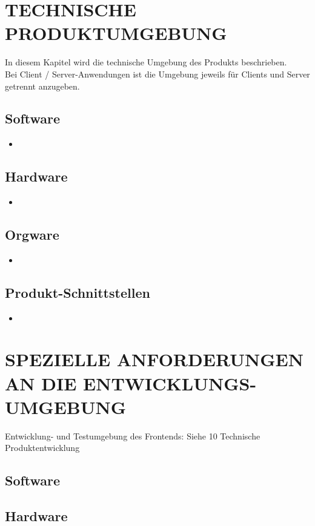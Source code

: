 	
	\section{\Large TECHNISCHE PRODUKTUMGEBUNG}
   	In diesem Kapitel wird die technische Umgebung des Produkts beschrieben.\\
   	Bei Client / Server-Anwendungen ist die Umgebung jeweils für Clients und Server getrennt anzugeben.

	\subsection{Software}
	\begin{itemize}
		\item
	\end{itemize}

	\subsection{Hardware}
	\begin{itemize}
		\item
	\end{itemize}

	\subsection{Orgware}
	\begin{itemize}
		\item
	\end{itemize}	

	\subsection{Produkt-Schnittstellen}
	\begin{itemize}
		\item
	\end{itemize}
	
	\section{\Large SPEZIELLE ANFORDERUNGEN AN DIE ENTWICKLUNGS-UMGEBUNG}
	Entwicklung- und Testumgebung des Frontends: Siehe 10 Technische Produktentwicklung 
	\subsection{Software}
	\subsection{Hardware}
